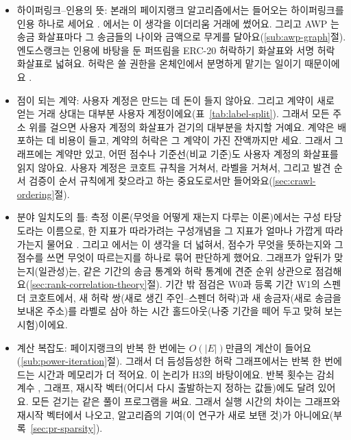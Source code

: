 \begin{itemize}
\item 하이퍼링크--인용의 뜻: 본래의 페이지랭크 알고리즘에서는 들어오는 하이퍼링크를 인용 하나로 세어요 \parencite{page1999pagerank}. \textcite{do2023hodgerank}에서는 이 생각을 이더리움 거래에 썼어요. 그리고 AWP \parencite{do2023awp}는 송금 화살표마다 그 송금들의 나이와 금액으로 무게를 달아요(\ref{sub:awp-graph}절). 엔도스랭크는 인용에 바탕을 둔 퍼뜨림을 ERC-20 허락하기 화살표와 서명 허락 화살표로 넓혀요. 허락은 쓸 권한을 온체인에서 분명하게 맡기는 일이기 때문이에요 \parencite{vogelsteller2015erc20}.

\item 점이 되는 계약: 사용자 계정은 만드는 데 돈이 들지 않아요. 그리고 계약이 새로 얻는 거래 상대는 대부분 사용자 계정이에요(표~\ref{tab:label-split}). 그래서 모든 주소 위를 걸으면 사용자 계정의 화살표가 걷기의 대부분을 차지할 거예요. 계약은 배포하는 데 비용이 들고, 계약의 허락은 그 계약이 가진 잔액까지만 세요. 그래서 그래프에는 계약만 있고, 어떤 점수나 기준선(비교 기준)도 사용자 계정의 화살표를 읽지 않아요. 사용자 계정은 코호트 규칙을 거쳐서, 라벨을 거쳐서, 그리고 발견 순서 검증이 순서 규칙에게 찾으라고 하는 중요도로서만 들어와요(\ref{sec:crawl-ordering}절).

\item 분야 일치도의 틀: 측정 이론(무엇을 어떻게 재는지 다루는 이론)에서는 구성 타당도라는 이름으로, 한 지표가 따라가려는 구성개념을 그 지표가 얼마나 가깝게 따라가는지 물어요 \parencite{cronbach1955construct}. 그리고 \textcite{messick1995validity}에서는 이 생각을 더 넓혀서, 점수가 무엇을 뜻하는지와 그 점수를 쓰면 무엇이 따르는지를 하나로 묶어 판단하게 했어요. 그래프가 앞뒤가 맞는지(일관성)는, 같은 기간의 송금 통계와 허락 통계에 견준 순위 상관으로 점검해요(\ref{sec:rank-correlation-theory}절). 기간 밖 점검은 W0과 등록 기간 W1의 스펜더 코호트에서, 새 허락 쌍(새로 생긴 주인–스펜더 허락)과 새 송금자(새로 송금을 보내온 주소)를 라벨로 삼아 하는 시간 홀드아웃(나중 기간을 떼어 두고 맞혀 보는 시험)이에요.

\item 계산 복잡도: 페이지랭크의 반복 한 번에는 $O(|E|)$만큼의 계산이 들어요(\ref{sub:power-iteration}절). 그래서 더 듬성듬성한 허락 그래프에서는 반복 한 번에 드는 시간과 메모리가 더 적어요. 이 논리가 H3의 바탕이에요. 반복 횟수는 감쇠 계수 \parencite{langville2006pagerank}, 그래프, 재시작 벡터(어디서 다시 출발하는지 정하는 값들)에도 달려 있어요. 모든 걷기는 같은 풀이 프로그램을 써요. 그래서 실행 시간의 차이는 그래프와 재시작 벡터에서 나오고, 알고리즘의 기여(이 연구가 새로 보탠 것)가 아니에요(부록~\ref{sec:pr-sparsity}).


\end{itemize}
